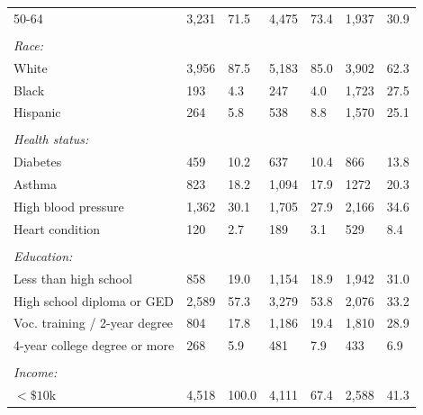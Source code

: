 \documentclass[hidelinks,12pt]{article}
\begin{document}
{\begin{singlespace}
\begin{longtable}{lllllll}
\hspace{3mm}50-64 & 3,231 & 71.5 & 4,475 & 73.4 & 1,937 & 30.9 \\ 
 &  & & &  &  & \\ 
\textit{Race:} &  & & &  &  & \\ 
\hspace{3mm}White & 3,956 & 87.5 & 5,183 & 85.0 & 3,902 & 62.3  \\ 

\hspace{3mm}Black & 193 & 4.3 & 247 & 4.0 & 1,723 & 27.5  \\ 

\hspace{3mm}Hispanic &  264 & 5.8 & 538 & 8.8 & 1,570 & 25.1  \\ 
 &  & & &  &  & \\ 
\textit{Health status:} &  & & &  &  & \\ 
\hspace{3mm}Diabetes & 459 & 10.2 & 637 & 10.4 & 866 & 13.8  \\ 

\hspace{3mm}Asthma & 823 & 18.2 & 1,094 & 17.9 & 1272 & 20.3   \\ 

\hspace{3mm}High blood pressure & 1,362 & 30.1 & 1,705 & 27.9 & 2,166 & 34.6  \\ 
  
\hspace{3mm}Heart condition & 120 & 2.7 & 189 & 3.1 & 529 & 8.4 \\ 
 &  & & &  &  & \\ 
\textit{Education:} &  & & &  &  & \\  
\hspace{3mm}Less than high school  & 858 & 19.0 & 1,154 & 18.9 & 1,942 & 31.0  \\ 
  
\hspace{3mm}High school diploma or GED & 2,589 & 57.3 & 3,279 & 53.8 & 2,076 & 33.2   \\ 

\hspace{3mm}Voc. training / 2-year degree & 804 & 17.8 & 1,186 & 19.4 & 1,810 & 28.9  \\ 

\hspace{3mm}4-year college degree or more & 268 & 5.9 & 481 & 7.9 & 433 & 6.9  \\ 
 &  & & &  &  & \\ 
\textit{Income:} &  & & &  &  & \\ 
\hspace{3mm} $<\$10$k & 4,518 & 100.0 & 4,111 & 67.4 & 2,588 & 41.3  \\


\end{longtable}
\end{singlespace}}
\end{document}
